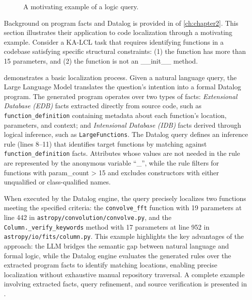 \begin{figure}
    \caption{A motivating example of a logic query.}
    \label{fig:example}
\end{figure}

Background on program facts and Datalog is provided in  of \cref{ch:chapter2}. This section illustrates their application to code localization through a motivating example. Consider a KA-LCL task that requires identifying functions in a codebase satisfying specific structural constraints: (1) the function has more than 15 parameters, and (2) the function is not an \_\_init\_\_ method.

 demonstrates a basic localization process. Given a natural language query, the Large Language Model translates the question's intention into a formal Datalog program. The generated program operates over two types of facts: \textit{Extensional Database (EDB)} facts extracted directly from source code, such as \texttt{function\_definition} containing metadata about each function's location, parameters, and context; and \textit{Intensional Database (IDB)} facts derived through logical inference, such as \texttt{LargeFunctions}. The Datalog query defines an inference rule (lines 8--11) that identifies target functions by matching against \texttt{function\_definition} facts. Attributes whose values are not needed in the rule are represented by the anonymous variable ``\_'', while the rule filters for functions with param\_count > 15 and excludes constructors with either unqualified or class-qualified names.

When executed by the \souffle{} Datalog engine, the query precisely localizes two functions meeting the specified criteria: the \texttt{convolve\_fft} function with 19 parameters at line 442 in \texttt{astropy/convolution/convolve.py}, and the \texttt{Column.\allowbreak\_verify\_keywords} method with 17 parameters at line 952 in \texttt{astropy/io/fits/column.py}. This example highlights the key advantages of the approach: the LLM bridges the semantic gap between natural language and formal logic, while the Datalog engine evaluates the generated rules over the extracted program facts to identify matching locations, enabling precise localization without exhaustive manual repository traversal. A complete example involving extracted facts, query refinement, and source verification is presented in .
